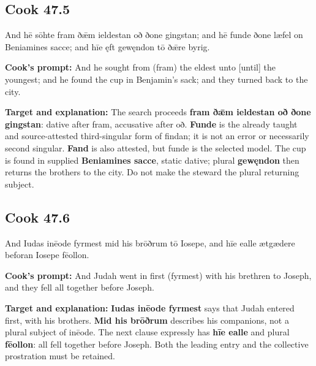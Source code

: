 \par\begin{minipage}{\linewidth}\raggedright
\subsection*{Cook 47.5}

And hē sōhte fram ðǣm ieldestan oð ðone gingstan; and hē funde ðone læfel on Beniamines sacce; and hīe ęft gewęndon tō ðǣre byrig.

\textbf{Cook’s prompt:} And he sought from (fram) the eldest unto [until] the youngest; and he found the cup in Benjamin’s sack; and they turned back to the city.

\textbf{Target and explanation:} The search proceeds \textbf{fram ðǣm ieldestan oð ðone gingstan}: dative after fram, accusative after oð. \textbf{Funde} is the already taught and source-attested third-singular form of findan; it is not an error or necessarily second singular. \textbf{Fand} is also attested, but funde is the selected model. The cup is found in supplied \textbf{Beniamines sacce}, static dative; plural \textbf{gewęndon} then returns the brothers to the city. Do not make the steward the plural returning subject.

\end{minipage}\par\addvspace{4pt}

\par\begin{minipage}{\linewidth}\raggedright
\subsection*{Cook 47.6}

And Iudas inēode fyrmest mid his brōðrum tō Iosepe, and hīe ealle ætgædere beforan Iosepe fēollon.

\textbf{Cook’s prompt:} And Judah went in first (fyrmest) with his brethren to Joseph, and they fell all together before Joseph.

\textbf{Target and explanation:} \textbf{Iudas inēode fyrmest} says that Judah entered first, with his brothers. \textbf{Mid his brōðrum} describes his companions, not a plural subject of inēode. The next clause expressly has \textbf{hīe ealle} and plural \textbf{fēollon}: all fell together before Joseph. Both the leading entry and the collective prostration must be retained.

\end{minipage}\par\addvspace{4pt}

